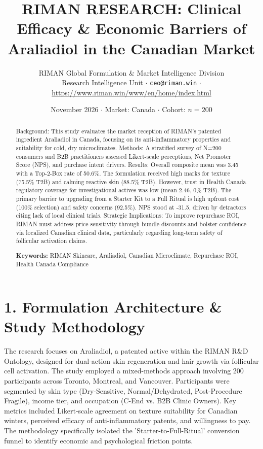\documentclass[10pt,twocolumn,a4paper]{article}
\title{\textbf{RIMAN RESEARCH: Clinical Efficacy \& Economic Barriers of Araliadiol in the Canadian Market}}
\author{RIMAN Global Formulation \& Market Intelligence Division\\
\small Research Intelligence Unit $\cdot$ \texttt{ceo@riman.win} $\cdot$ \url{https://www.riman.win/www/en/home/index.html}}
\date{November 2026 \quad $\cdot$ \quad Market: Canada \quad $\cdot$ \quad Cohort: $n = 200$}
\begin{document}
\maketitle

\begin{abstract}
Background: This study evaluates the market reception of RIMAN's patented ingredient Araliadiol in Canada, focusing on its anti-inflammatory properties and suitability for cold, dry microclimates. Methods: A stratified survey of N=200 consumers and B2B practitioners assessed Likert-scale perceptions, Net Promoter Score (NPS), and purchase intent drivers. Results: Overall composite mean was 3.45 with a Top-2-Box rate of 50.6\%. The formulation received high marks for texture (75.5\% T2B) and calming reactive skin (88.5\% T2B). However, trust in Health Canada regulatory coverage for investigational actives was low (mean 2.46, 0\% T2B). The primary barrier to upgrading from a Starter Kit to a Full Ritual is high upfront cost (100\% selection) and safety concerns (92.5\%). NPS stood at -31.5, driven by detractors citing lack of local clinical trials. Strategic Implications: To improve repurchase ROI, RIMAN must address price sensitivity through bundle discounts and bolster confidence via localized Canadian clinical data, particularly regarding long-term safety of follicular activation claims.

\vspace{0.4em}
\noindent\textbf{Keywords:} RIMAN Skincare, Araliadiol, Canadian Microclimate, Repurchase ROI, Health Canada Compliance
\end{abstract}

\section{1. Formulation Architecture \& Study Methodology}
The research focuses on Araliadiol, a patented active within the RIMAN R\&D Ontology, designed for dual-action skin regeneration and hair growth via follicular cell activation. The study employed a mixed-methods approach involving 200 participants across Toronto, Montreal, and Vancouver. Participants were segmented by skin type (Dry-Sensitive, Normal/Dehydrated, Post-Procedure Fragile), income tier, and occupation (C-End vs. B2B Clinic Owners). Key metrics included Likert-scale agreement on texture suitability for Canadian winters, perceived efficacy of anti-inflammatory patents, and willingness to pay. The methodology specifically isolated the 'Starter-to-Full-Ritual' conversion funnel to identify economic and psychological friction points.
\end{document}
